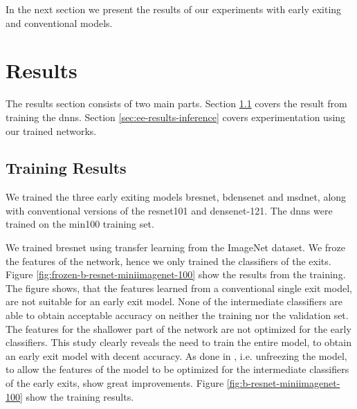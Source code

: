 In the next section we present the results of our experiments with early exiting and conventional models.

\section{Results} \label{sec:ee-results}

The results section consists of two main parts. Section \ref{sec:ee-results-training} covers the result from training the \gls{dnn}s. Section \ref{sec:ee-results-inference} covers experimentation using our trained networks. 

\subsection{Training Results} \label{sec:ee-results-training}

We trained the three early exiting models \gls{bresnet}, \gls{bdensenet} and \gls{msdnet}, along with conventional versions of the \gls{resnet}101 and \gls{densenet}-121. The \gls{dnn}s were trained on the \gls{min100} training set.

We trained \gls{bresnet} using transfer learning from the ImageNet dataset. We froze the features of the network, hence we only trained the classifiers of the exits. Figure \ref{fig:frozen-b-resnet-miniimagenet-100} show the results from the training. The figure shows, that the features learned from a conventional single exit model, are not suitable for an early exit model. None of the intermediate classifiers are able to obtain acceptable accuracy on neither the training nor the validation set. The features for the shallower part of the network are not optimized for the early classifiers. This study clearly reveals the need to train the entire model, to obtain an early exit model with decent accuracy. As done in \cite{teerapittayanon_branchynet:_2016}, i.e. unfreezing the model, to allow the features of the model to be optimized for the intermediate classifiers of the early exits, show great improvements. Figure \ref{fig:b-resnet-miniimagenet-100} show the training results.

